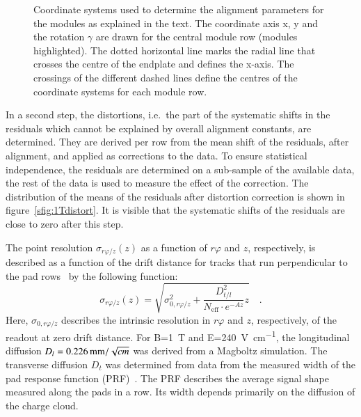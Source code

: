 \documentclass[preprint]{elsarticle}
\begin{document}
\begin{figure}[tb]
\centering
\iftoggle{blackandwhite}{\texttt{[image: figures/coordinates\_with\_endplate\_rowwise-2BW.pdf]}}{\texttt{[image: figures/coordinates\_with\_endplate\_rowwise-2.pdf]}}
\caption{\small Coordinate systems used to determine the alignment parameters for the modules as explained in the text. The coordinate axis x, y and the rotation $\gamma$ are drawn for the central module row (modules highlighted). The dotted horizontal line marks the radial line that crosses the centre of the endplate and defines the x-axis. The crossings of the different dashed lines define the centres of the coordinate systems for each module row.}
\label{fig:coordinate}
\end{figure}


In a second step, the distortions, i.e.\ the part of the systematic shifts in the residuals which cannot be explained by overall alignment constants, are determined. They are derived per row from the mean shift of the residuals, after alignment, and applied as corrections to the data. To ensure statistical independence, the residuals are determined on a sub-sample of the available data, the rest of the data is used to measure the effect of the correction. The distribution of the means of the residuals after distortion correction is shown in figure~\ref{sfig:1Tdistort}. It is visible that the systematic shifts of the residuals are close to zero after this step.


The point resolution $\sigma_{r\varphi/z}(z)$ as a function of $r\varphi$ and $z$, respectively, is described as a function of the drift distance for tracks that run perpendicular to the pad rows~\cite{Blum:2008} by the following function:
\begin{equation}
\sigma_{r\varphi/z} (z) =\sqrt{\sigma_{0,r\varphi / z}^2+\frac{D_{t/l}^2}{N_{\mathrm{eff}}\cdot e^{-Az}}z} \quad . 
 \label{math:zResolutionElectronLoss}
\end{equation}
Here, $\sigma_{0,r\varphi / z}$ describes the intrinsic resolution in $r\varphi$ and $z$, respectively, of the readout at zero drift distance. For B=\SI{1}{\tesla} and E=\SI[per-mode=symbol]{240}{\V\per\cm}, the longitudinal diffusion $D_{l}=\SI[per-mode=symbol]{0.226}{\mm \per \sqrt{\cm}}$ was derived from a Magboltz simulation. The transverse diffusion $D_{t}$ was determined from data from the measured width of the pad response function (PRF)~\cite{Blum:2008}. The PRF describes the average signal shape measured along the pads in a row. Its width depends primarily on the diffusion of the charge cloud. 
\end{document}
